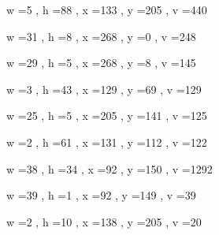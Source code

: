 \documentclass[11pt]{article}
\begin{document}
\par
w =5 , h =88 , x =133 , y =205 , v =440
\par
w =31 , h =8 , x =268 , y =0 , v =248
\par
w =29 , h =5 , x =268 , y =8 , v =145
\par
w =3 , h =43 , x =129 , y =69 , v =129
\par
w =25 , h =5 , x =205 , y =141 , v =125
\par
w =2 , h =61 , x =131 , y =112 , v =122
\par
w =38 , h =34 , x =92 , y =150 , v =1292
\par
w =39 , h =1 , x =92 , y =149 , v =39
\par
w =2 , h =10 , x =138 , y =205 , v =20
\par
\newpage
\end{document}
